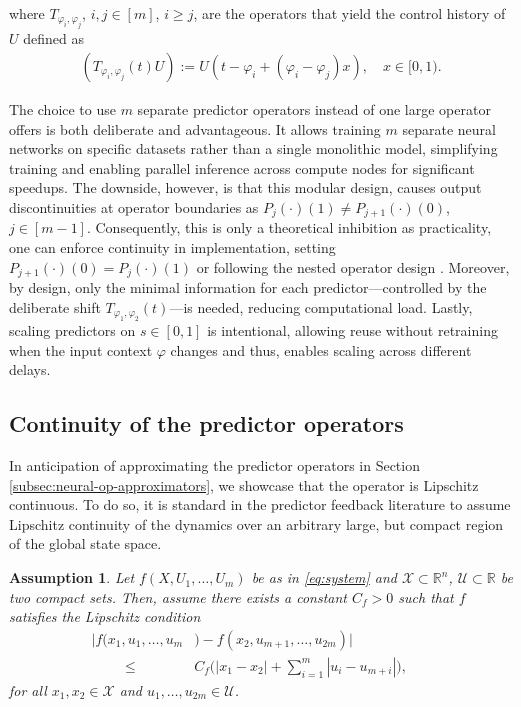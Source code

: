 \documentclass[letterpaper, 10 pt, conference]{ieeeconf}  %
\newtheorem{assumption}[theorem]{Assumption}
\begin{document}
where $T_{\varphi_i,\varphi_j}$, $i, j \in [m]$, $i \geq j$, are the operators that yield the control history of $U$ defined as
\begin{align}
    (T_{\varphi_i,\varphi_j}(t)U) := U(t-\varphi_i+(\varphi_i-\varphi_j)x), \quad x \in [0,1).
\end{align}



The choice to use $m$ separate predictor operators instead of one large operator offers is both deliberate and advantageous. It allows training $m$ separate neural networks on specific datasets rather than a single monolithic model, simplifying training and enabling parallel inference across compute nodes for significant speedups. The downside, however, is that this modular design, causes output discontinuities at operator boundaries as 
$P_{j}(\cdot)(1) \neq P_{j+1}(\cdot)(0)$, 
$j \in [m-1]$. 
Consequently, this is only a theoretical inhibition as practicality, one can enforce continuity in implementation, setting $P_{j+1}(\cdot)(0) = P_{j}(\cdot)(1)$ or following the nested operator design \cite{D2EE04204E}. Moreover, by design, only the minimal information for each predictor—controlled by the deliberate shift $T_{\varphi_1, \varphi_2}(t)$—is needed, reducing computational load.  Lastly, scaling predictors on $s \in [0, 1]$ is intentional, allowing reuse without retraining when the input context $\varphi$ changes and thus, enables scaling across different delays.

\subsection{Continuity of the predictor operators} \label{subsec:continuity}
 In anticipation of approximating the predictor operators in Section \ref{subsec:neural-op-approximators}, we showcase that the operator is Lipschitz continuous.
 To do so, it is standard in the predictor feedback literature \cite{Predictor_Feedback_For_Delay_Systems, Luke_Peijia:2025} to assume Lipschitz continuity of the dynamics over an arbitrary large, but compact region of the global state space. 

 
\begin{assumption}\label{assumption:lipschitz}
Let $f(X,U_1,\dots,U_m)$ be as in \eqref{eq:system} and $\mathcal{X} \subset \mathbb{R}^n$, $\mathcal{U} \subset \mathbb{R}$ be two compact sets. Then, assume there exists a constant $C_f > 0$ such that $f$ satisfies the Lipschitz condition
\begin{align}
    \big| f(x_1,u_1,\dots,u_m&)-f(x_2,u_{m+1},\dots,u_{2m}) \big|\nonumber  &&\\ \hspace{1cm} \leq& C_f \bigg( |x_1-x_2| + \sum_{i=1}^m |u_i - u_{m+i}| \bigg),
\end{align}
for all $x_1,x_2 \in \mathcal{X}$ and $u_1,\dots,u_{2m} \in \mathcal{U}$.
\end{assumption}
\end{document}

